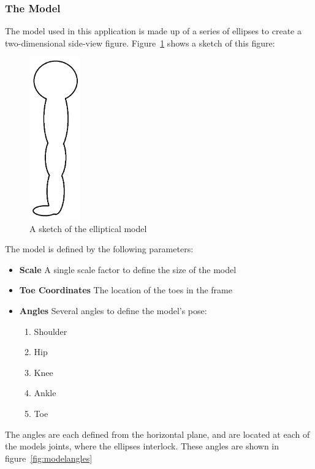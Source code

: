 \subsubsection{The Model}
\label{subsec:model}

The model used in this application is made up of a series of ellipses to create a two-dimensional side-view figure. Figure~\ref{fig:modelellipses} shows a sketch of this figure:

\begin{figure}[H]
    \centering
	\includegraphics[height=7cm]{algorithm/images/model}
\caption{A sketch of the elliptical model}
\label{fig:modelellipses}
\end{figure}

The model is defined by the following parameters:

\begin{itemize}
	\item \textbf{Scale} A single scale factor to define the size of the model
	\item \textbf{Toe Coordinates} The location of the toes in the frame
	\item \textbf{Angles} Several angles to define the model's pose:
		\begin{enumerate}
			\item Shoulder
			\item Hip
			\item Knee
			\item Ankle
			\item Toe
		\end{enumerate}
\end{itemize}

The angles are each defined from the horizontal plane, and are located at each of the models joints, where the ellipses interlock. These angles are shown in figure~\ref{fig:modelangles}

